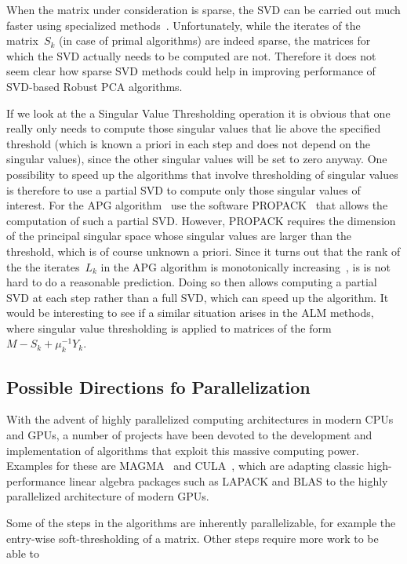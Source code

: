 \documentclass{../../common/projectreport}
\begin{document}
When the matrix under consideration is sparse, the SVD can be carried out much faster using specialized methods~\cite{Berry:2005uq}. Unfortunately, while the iterates of the matrix~$S_k$ (in case of primal algorithms) are indeed sparse, the matrices for which the SVD actually needs to be computed are not. Therefore it does not seem clear how sparse SVD methods could help in improving performance of SVD-based Robust PCA algorithms. 

If we look at the a Singular Value Thresholding operation it is obvious that one really only needs to compute those singular values that lie above the specified threshold (which is known a priori in each step and does not depend on the singular values), since the other singular values will be set to zero anyway. One possibility to speed up the algorithms that involve thresholding of singular values is therefore to use a partial SVD to compute only those singular values of interest. For the APG algorithm~\cite{Lin:2010fk} use the software PROPACK~\cite{Larsen:1998uq} that allows the computation of such a partial SVD. However, PROPACK requires the dimension of the principal singular space whose singular values are larger than the threshold, which is of course unknown a priori. Since it turns out that the rank of the the iterates~$L_k$ in the APG algorithm is monotonically increasing~\cite{Lin:2010fk}, is is not hard to do a reasonable prediction. Doing so then allows computing a partial SVD at each step rather than a full SVD, which can speed up the algorithm. It would be interesting to see if a similar situation arises in the ALM methods, where singular value thresholding is applied to matrices of the form $M-S_{k} +\mu_k^{-1}Y_{k}$.




\subsection{Possible Directions fo Parallelization}
\label{Algorithms:Discussion:Parallel:Subsec}

With the advent of highly parallelized computing architectures in modern CPUs and GPUs, a number of projects have been devoted to the development and implementation of algorithms that exploit this massive computing power. Examples for these are MAGMA~\cite{Smith:2010tg} and CULA~\cite{Humphrey:2010kl}, which are adapting classic high-performance linear algebra packages such as LAPACK and BLAS to the highly parallelized architecture of modern GPUs. 

Some of the steps in the algorithms are inherently parallelizable, for example the entry-wise soft-thresholding of a matrix. Other steps require more work to be able to 

\cite{Boyd:2011hc}







\end{document}
